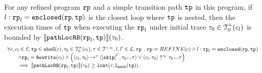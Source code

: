 \begin{lemma}
  For any refined program $\mathtt{rp}$ and a simple transition path $\mathtt{tp}$ in this program,
  if $l: \mathtt{rp}_l = \mathtt{enclosed}(\mathtt{rp}, \mathtt{tp})$ is the closest loop where $\mathtt{tp}$ is nested,
  then the execution times of $\mathtt{tp}$ when executing the $\mathtt{rp}_l$ under initial trace $\mathtt{\tau}_0 \in \mathcal{T}^{+}_0(c_l)$ is bounded by $\llbracket \mathtt{pathLocRB}(\mathtt{rp}_l, \mathtt{tp}) \rrbracket(\mathtt{\tau}_0)$.
  \[
    \begin{array}{l}
    \forall c, c_l \in \cdom, \tpath \in \absG(c), \trace_0 \in \ftdom_0(c_l), \trace \in \tdom, l, l' \in \ldom, \rprog \st 
    \rprog = REFINE(c)
    \land
    l: \rprog_l = \kw{enclosed}(\rprog, \tpath)
    \\ \qquad
    \land 
    \rprog_l = \algrewrite(c_l)
    \land
    \Big(
    \config{c_l, \trace_0} \rightarrow^* \config{\clabel{\eskip}^{l'}, \trace_0 \tracecat \trace}
    \lor \config{c_l, \trace_0} \uparrow^{\infty} \trace_0 \tracecat \trace 
    \Big)
    \\ \qquad
    \implies
    \econfig{\outinB(\rprog_l, \tpath)}(\trace_0) \geq \lcounter(\trace, \pathl(\tpath)).
    \end{array}
  \]  
\end{lemma}
